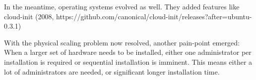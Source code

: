 In the meantime, operating systems evolved as well. They added features like cloud-init (2008, https://github.com/canonical/cloud-init/releases?after=ubuntu-0.3.1)


With the physical scaling problem now resolved, another pain-point emerged: When a larger set of hardware needs to be installed, either one administrator per installation is required or sequential installation is imminent. This means either a lot of administrators are needed, or significant longer installation time.






